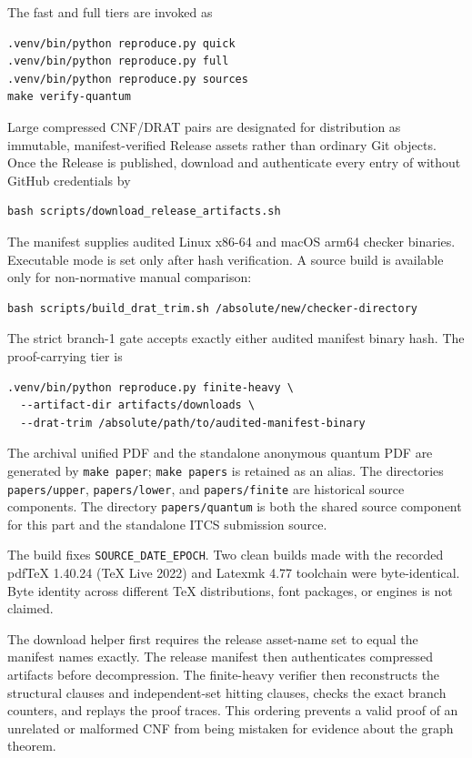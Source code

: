 The fast and full tiers are invoked as
\begin{verbatim}
.venv/bin/python reproduce.py quick
.venv/bin/python reproduce.py full
.venv/bin/python reproduce.py sources
make verify-quantum
\end{verbatim}
Large compressed CNF/DRAT pairs are designated for distribution as immutable,
manifest-verified Release assets rather than ordinary Git objects.  Once the
Release is published, download
and authenticate every entry of  without GitHub
credentials by
\begin{verbatim}
bash scripts/download_release_artifacts.sh
\end{verbatim}
The manifest supplies audited Linux x86-64 and macOS arm64 checker binaries.
Executable mode is set only after hash verification.  A source build is
available only for non-normative manual comparison:
\begin{verbatim}
bash scripts/build_drat_trim.sh /absolute/new/checker-directory
\end{verbatim}
The strict branch-1 gate accepts exactly either audited manifest binary hash.
The proof-carrying tier is
\begin{verbatim}
.venv/bin/python reproduce.py finite-heavy \
  --artifact-dir artifacts/downloads \
  --drat-trim /absolute/path/to/audited-manifest-binary
\end{verbatim}
The archival unified PDF and the standalone anonymous quantum PDF are
generated by \texttt{make paper}; \texttt{make papers} is retained as an
alias.  The directories \texttt{papers/upper}, \texttt{papers/lower}, and
\texttt{papers/finite} are historical source components.  The directory
\texttt{papers/quantum} is both the shared source component for this part and
the standalone ITCS submission source.

The build fixes \texttt{SOURCE\_DATE\_EPOCH}.  Two clean builds made with the
recorded pdf\TeX{} 1.40.24 (\TeX{} Live 2022) and Latexmk 4.77 toolchain were
byte-identical.  Byte identity across different \TeX{} distributions, font
packages, or engines is not claimed.

The download helper first requires the release asset-name set to equal the
manifest names exactly.  The release manifest then authenticates compressed
artifacts before decompression.
The finite-heavy verifier then reconstructs the structural clauses and
independent-set hitting clauses, checks the exact branch counters, and replays
the proof traces.  This ordering prevents a valid proof of an unrelated or
malformed CNF from being mistaken for evidence about the graph theorem.
